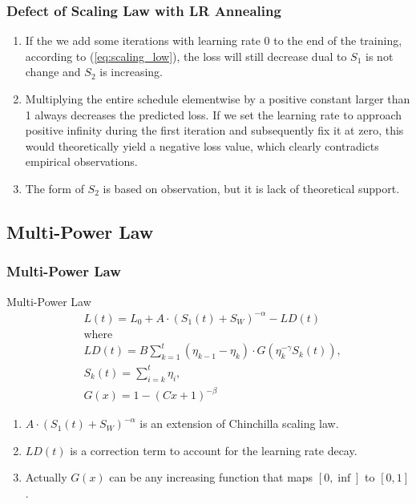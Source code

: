 \documentclass[aspectratio=169]{beamer}
\begin{document}
\begin{frame}
    \frametitle{Defect of Scaling Law with LR Annealing}
    \begin{enumerate}
        \item If the we add some iterations with learning rate 0 to
            the end of the training, according to
            (\ref{eq:scaling_low}), the loss will still decrease dual
            to $S_1$ is not change and $S_2$ is increasing.
        \item Multiplying the entire schedule elementwise by a
            positive constant larger than 1 always decreases the predicted loss.
            If we set the learning rate to approach positive infinity
            during the first iteration and subsequently fix it at
            zero, this would theoretically yield a negative loss
            value, which clearly contradicts empirical observations.
        \item The form of $S_2$ is based on observation, but it is lack of
            theoretical support.
    \end{enumerate}
\end{frame}

\subsection{Multi-Power Law}\label{subsec:MPL}

\begin{frame}
    \frametitle{Multi-Power Law}
    \begin{block}{Multi-Power Law}
        \begin{equation}
            \label{eq:multi_power_law}
            \begin{aligned}
                &L(t) = L_0 + A\cdot (S_1(t) + S_W)^{-\alpha} - LD(t)\\
                &\text{where} \\
                & LD(t) = B\sum_{k=1}^{t}(\eta_{k-1}-\eta_k)\cdot
                G(\eta_k^{-\gamma}S_k(t)), \\
                &S_k(t) = \sum_{i=k}^{t} \eta_i, \\
                &G(x) = 1-(Cx+1)^{-\beta}
            \end{aligned}
        \end{equation}
    \end{block}

    \begin{enumerate}
        \item $A\cdot (S_1(t) + S_W)^{-\alpha}$ is an extension of
            Chinchilla scaling law.
        \item $LD(t)$ is a correction term to account for the
            learning rate decay.
        \item Actually $G(x)$ can be any increasing function that
            maps $[0, \inf]$ to $[0, 1]$.
    \end{enumerate}
\end{frame}
\end{document}
